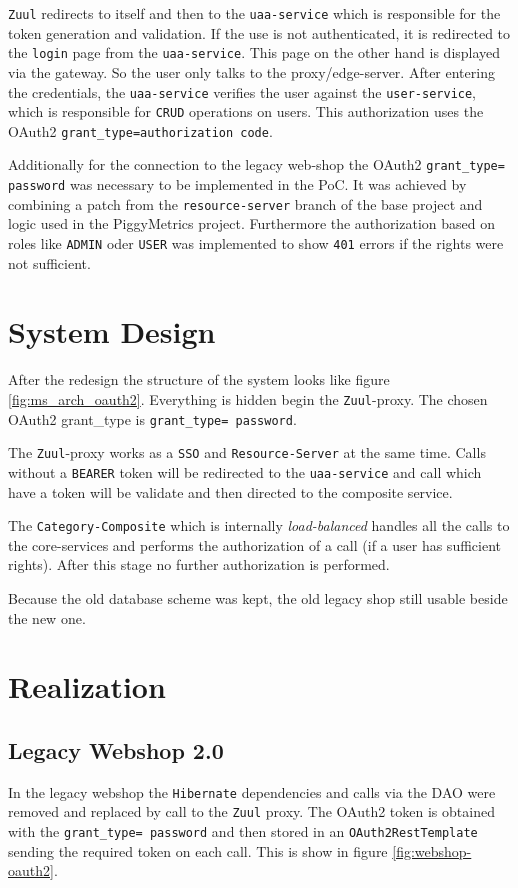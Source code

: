 \documentclass[11pt]{article}
\begin{document}
	\texttt{Zuul} redirects to itself and then to the \texttt{uaa-service} which is responsible for the token generation and validation. If the use is not authenticated, it is redirected to the \texttt{login} page from the \texttt{uaa-service}. This page on the other hand is displayed via the gateway. So the user only talks to the proxy/edge-server. After entering the credentials, the \texttt{uaa-service} verifies the user against the \texttt{user-service}, which is responsible for \texttt{CRUD} operations on users. This authorization uses the OAuth2 \texttt{grant\_type=authorization code}.
	
	Additionally for the connection to the legacy web-shop the OAuth2 \texttt{grant\_type= password} was necessary to be implemented in the PoC. It was achieved by combining a patch from the \texttt{resource-server} branch of the base project and logic used in the PiggyMetrics project. Furthermore the authorization based on roles like \texttt{ADMIN} oder \texttt{USER} was implemented to show \texttt{401} errors if the rights were not sufficient.
	
	\section{System Design}
	After the redesign the structure of the system looks like figure \ref{fig:ms_arch_oauth2}. Everything is hidden begin the \texttt{Zuul}-proxy. The chosen OAuth2 grant\_type is \texttt{grant\_type= password}.
	
	The \texttt{Zuul}-proxy works as a \texttt{SSO} and \texttt{Resource-Server} at the same time. Calls without a \texttt{BEARER} token will be redirected to the \texttt{uaa-service} and call which have a token will be validate and then directed to the composite service.
	
	The \texttt{Category-Composite} which is internally \textit{load-balanced} handles all the calls to the core-services and performs the authorization of a call (if a user has sufficient rights). After this stage no further authorization is performed. 
	
    Because the old database scheme was kept, the old legacy shop still usable beside the new one.
	
	\section{Realization}
	\subsection{Legacy Webshop 2.0}
	In the legacy webshop the \texttt{Hibernate} dependencies and calls via the DAO were removed and replaced by call to the \texttt{Zuul} proxy. 
	The OAuth2 token is obtained with the \texttt{grant\_type= password} and then stored in 
	an \texttt{OAuth2RestTemplate} sending the required token on each call. This is show in figure \ref{fig:webshop-oauth2}.
	
\end{document}
